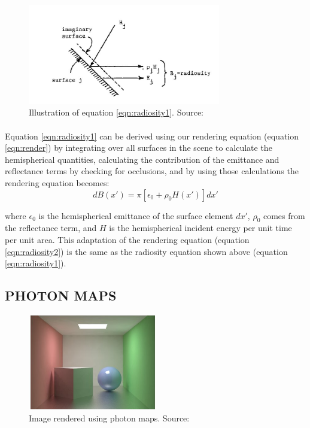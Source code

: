 \begin{figure}[h!]
  \centering
    \includegraphics[width=0.75\textwidth]{radiosityCalc2.jpg}
  \caption{Illustration of equation \ref{eqn:radiosity1}. Source: \protect\cite{Goral1984}}
	\label{fig:radiosityCalc2}
\end{figure}

\paragraph{}
Equation \ref{eqn:radiosity1} can be derived using our rendering equation (equation \ref{eqn:render}) \cite{Kajiya1986} by integrating over all surfaces in the scene to calculate the hemispherical quantities, calculating the contribution of the emittance and reflectance terms by checking for occlusions, and by using those calculations the rendering equation becomes:
\begin{equation}
dB(x') = \pi[\epsilon_{0} + \rho_{0}H(x')]dx' \label{eqn:radiosity2}
\end{equation}

where $\epsilon_{0}$ is the hemispherical emittance of the surface element $dx'$, $\rho_{0}$ comes from the reflectance term, and $H$ is the hemispherical incident energy per unit time per unit area.  This adaptation of the rendering equation (equation \ref{eqn:radiosity2}) is the same as the radiosity equation shown above (equation \ref{eqn:radiosity1}).

\subsection{PHOTON MAPS}

\begin{figure}[h!]
  \centering
    \includegraphics[width=0.5\textwidth]{photonSample.jpg}
  \caption{Image rendered using photon maps. Source: \protect\cite{Jensen1996}}
	\label{fig:photonSample}
\end{figure}

